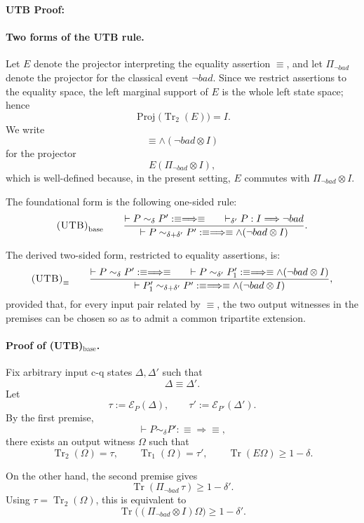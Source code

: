 \documentclass{report}
\theoremstyle{defn_style}
\begin{document}
\textbf{UTB Proof:}

\paragraph{Two forms of the UTB rule.}
Let $E$ denote the projector interpreting the equality assertion $\equiv$,
and let $\Pi_{\neg bad}$ denote the projector for the classical event $\neg bad$.
Since we restrict assertions to the equality space, the left marginal support
of $E$ is the whole left state space; hence
\[
\operatorname{Proj}\!\bigl(\operatorname{Tr}_2(E)\bigr)=I.
\]
We write
\[
\equiv \wedge (\neg bad \otimes I)
\]
for the projector
\[
E(\Pi_{\neg bad}\otimes I),
\]
which is well-defined because, in the present setting, $E$ commutes with
$\Pi_{\neg bad}\otimes I$.

\noindent
The foundational form is the following one-sided rule:
\[
\textsc{(UTB)}_{\mathrm{base}}
\qquad
\frac{
\vdash P \sim_{\delta} P' : \equiv \Longrightarrow \equiv
\qquad
\vdash_{\delta'} P : I \Longrightarrow \neg bad
}{
\vdash P \sim_{\delta+\delta'} P' : \equiv \Longrightarrow \equiv \wedge (\neg bad \otimes I)
}.
\]

\noindent
The derived two-sided form, restricted to equality assertions, is:
\[
\textsc{(UTB)}_{\equiv}
\qquad
\frac{
\vdash P \sim_{\delta} P' : \equiv \Longrightarrow \equiv
\qquad
\vdash P \sim_{\delta'} P'_1 : \equiv \Longrightarrow \equiv \wedge (\neg bad \otimes I)
}{
\vdash P'_1 \sim_{\delta+\delta'} P' : \equiv \Longrightarrow \equiv \wedge (\neg bad \otimes I)
},
\]
provided that, for every input pair related by $\equiv$, the two output witnesses
in the premises can be chosen so as to admit a common tripartite extension.

\paragraph{Proof of \textsc{(UTB)}$_{\mathrm{base}}$.}
Fix arbitrary input c-q states $\Delta,\Delta'$ such that
\[
\Delta \mathrel{\equiv} \Delta'.
\]
Let
\[
\tau := \mathcal{E}_{P}(\Delta),
\qquad
\tau' := \mathcal{E}_{P'}(\Delta').
\]
By the first premise,
\[
\vdash P \sim_{\delta} P' : \equiv \Longrightarrow \equiv,
\]
there exists an output witness $\Omega$ such that
\[
\operatorname{Tr}_2(\Omega)=\tau,
\qquad
\operatorname{Tr}_1(\Omega)=\tau',
\qquad
\operatorname{Tr}(E\Omega)\ge 1-\delta.
\]

On the other hand, the second premise gives
\[
\operatorname{Tr}(\Pi_{\neg bad}\,\tau)\ge 1-\delta'.
\]
Using $\tau=\operatorname{Tr}_2(\Omega)$, this is equivalent to
\[
\operatorname{Tr}\bigl((\Pi_{\neg bad}\otimes I)\Omega\bigr)\ge 1-\delta'.
\]
\end{document}
